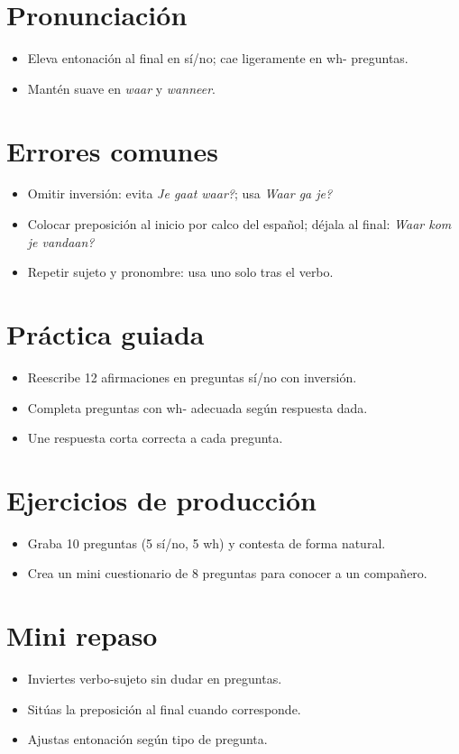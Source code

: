 \section{Pronunciación}
\begin{itemize}[leftmargin=*]
	\item Eleva entonación al final en sí/no; cae ligeramente en wh- preguntas.
	\item Mantén  suave en \textit{waar} y \textit{wanneer}.
\end{itemize}

\section{Errores comunes}
\begin{itemize}[leftmargin=*]
	\item Omitir inversión: evita \textit{Je gaat waar?}; usa \textit{Waar ga je?}
	\item Colocar preposición al inicio por calco del español; déjala al final: \textit{Waar kom je vandaan?}
	\item Repetir sujeto y pronombre: usa uno solo tras el verbo.
\end{itemize}

\section{Práctica guiada}
\begin{itemize}[leftmargin=*]
	\item Reescribe 12 afirmaciones en preguntas sí/no con inversión.
	\item Completa preguntas con wh- adecuada según respuesta dada.
	\item Une respuesta corta correcta a cada pregunta.
\end{itemize}

\section{Ejercicios de producción}
\begin{itemize}[leftmargin=*]
	\item Graba 10 preguntas (5 sí/no, 5 wh) y contesta de forma natural.
	\item Crea un mini cuestionario de 8 preguntas para conocer a un compañero.
\end{itemize}

\section{Mini repaso}
\begin{itemize}[leftmargin=*]
	\item Inviertes verbo-sujeto sin dudar en preguntas.
	\item Sitúas la preposición al final cuando corresponde.
	\item Ajustas entonación según tipo de pregunta.
\end{itemize}

